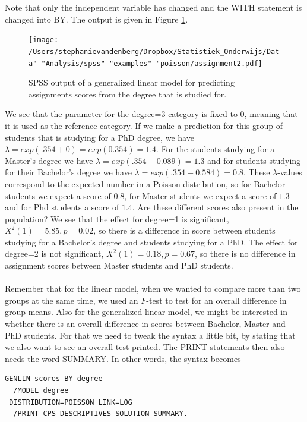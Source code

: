 \documentclass[]{report}\usepackage[]{graphicx}\usepackage[]{color}
\begin{document}
Note that only the independent variable has changed and the WITH statement is changed into BY. The output is given in Figure \ref{fig:assignment2}.



\begin{figure}[h]
    \begin{center}
       \texttt{[image: /Users/stephanievandenberg/Dropbox/Statistiek\_Onderwijs/Data" "Analysis/spss" "examples" "poisson/assignment2.pdf]}
    \end{center}
     \caption{SPSS output of a generalized linear model for predicting assignments scores from the degree that is studied for.}
    \label{fig:assignment2}
\end{figure}


We see that the parameter for the degree=3 category is fixed to 0, meaning that it is used as the reference category. If we make a prediction for this group of students that is studying for a PhD degree, we have $\lambda = exp(.354 + 0) = exp(0.354)=1.4$. For the students studying for a Master's degree we have $\lambda = exp(.354 - 0.089) =1.3$ and for students studying for their Bachelor's degree we have $\lambda = exp(.354 - 0.584) =0.8$. These $\lambda$-values correspond to the expected number in a Poisson distribution, so for Bachelor students we expect a score of $0.8$, for Master students we expect a score of $1.3$ and for Phd students a score of $1.4$. Are these different scores also present in the population? We see that the effect for degree=1 is significant, $X^2(1)=5.85, p=0.02$, so there is a difference in score between students studying for a Bachelor's degree and students studying for a PhD. The effect for degree=2 is not significant, $X^2(1)=0.18, p=0.67$, so there is no difference in assignment scores between Master students and PhD students.
\\
\\
Remember that for the linear model, when we wanted to compare more than two groups at the same time, we used an $F$-test to test for an overall difference in group means. Also for the generalized linear model, we might be interested in whether there is an overall difference in scores between Bachelor, Master and PhD students. For that we need to tweak the syntax a little bit, by stating that we also want to see an overall test printed. The PRINT statements then also needs the word SUMMARY. In other words, the syntax becomes

\begin{verbatim}
GENLIN scores BY degree
  /MODEL degree
 DISTRIBUTION=POISSON LINK=LOG
  /PRINT CPS DESCRIPTIVES SOLUTION SUMMARY.
\end{verbatim}
\end{document}
